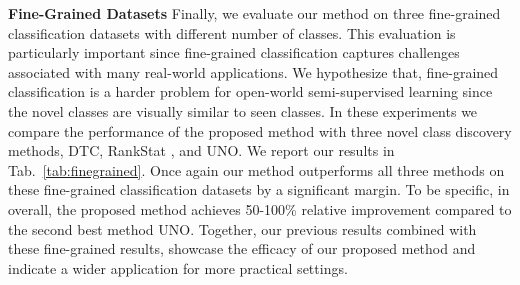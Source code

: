 \documentclass[runningheads]{eccv2022submission}
\begin{document}
\vspace{1mm}
\noindent \textbf{Fine-Grained Datasets} Finally, we evaluate our method on three fine-grained classification datasets with different number of classes. This evaluation is particularly important since fine-grained classification captures challenges associated with many real-world applications. We hypothesize that, fine-grained classification is a harder problem for open-world semi-supervised learning since the novel classes are visually similar to seen classes. In these experiments we compare the performance of the proposed method with three novel class discovery methods, DTC\cite{han2019learning}, RankStat \cite{Han2020Automatically}, and UNO\cite{fini2021unified}. We report our results in Tab.~\ref{tab:finegrained}. Once again our method outperforms all three methods on these fine-grained classification datasets by a significant margin. To be specific, in overall, the proposed method achieves 50-100\% relative improvement compared to the second best method UNO. Together, our previous results combined with these fine-grained results, showcase the efficacy of our proposed method and indicate a wider application for more practical settings.
\end{document}
